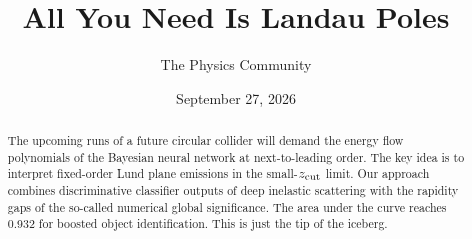 \documentclass[11pt]{article}
\title{All You Need Is Landau Poles}
\author{The Physics Community}
\date{September 27, 2026}
\numberwithin{equation}{section}
\theoremstyle{definition}
\theoremstyle{remark}
\begin{document}
\maketitle
\begin{abstract}
The upcoming runs of a future circular collider will demand the energy
flow polynomials of the Bayesian neural network at next-to-leading
order. The key idea is to interpret fixed-order Lund plane emissions in
the small-$z_{\rm cut}$ limit. Our approach combines discriminative
classifier outputs of deep inelastic scattering with the rapidity gaps
of the so-called numerical global significance. The area under the curve
reaches 0.932 for boosted object identification. This is just the tip of
the iceberg.
\end{abstract}
\tableofcontents





\nocite{*}


\end{document}
